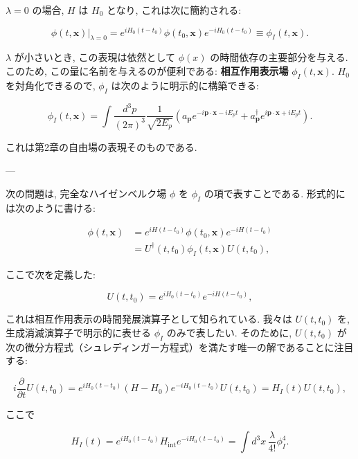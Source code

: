 \documentclass[a4paper,12pt]{article}
\begin{document}
$\lambda=0$ の場合, $H$ は $H_0$ となり, これは次に簡約される:

\begin{equation*}
\phi(t,\mathbf{x})\Big|_{\lambda=0} 
= e^{iH_0(t-t_0)} \phi(t_0,\mathbf{x}) e^{-iH_0(t-t_0)}
\equiv \phi_I(t,\mathbf{x}) .
\end{equation*}

$\lambda$ が小さいとき, この表現は依然として $\phi(x)$ の時間依存の主要部分を与える. 
このため, この量に名前を与えるのが便利である: 
\textbf{相互作用表示場} $\phi_I(t,\mathbf{x})$. 
$H_0$ を対角化できるので, $\phi_I$ は次のように明示的に構築できる:

\begin{equation*}
\phi_I(t,\mathbf{x}) = \int \frac{d^3p}{(2\pi)^3} \frac{1}{\sqrt{2E_p}}
\left( a_{\mathbf{p}} e^{-i\mathbf{p}\cdot \mathbf{x} - iE_p t} 
+ a^\dagger_{\mathbf{p}} e^{i\mathbf{p}\cdot \mathbf{x} + iE_p t} \right).
\end{equation*}

これは第2章の自由場の表現そのものである.

---

次の問題は, 完全なハイゼンベルク場 $\phi$ を $\phi_I$ の項で表すことである. 
形式的には次のように書ける:

\begin{align*}
\phi(t,\mathbf{x}) 
&= e^{iH(t-t_0)} \phi(t_0,\mathbf{x}) e^{-iH(t-t_0)} \\
&= U^\dagger(t,t_0)\phi_I(t,\mathbf{x})U(t,t_0),
\end{align*}

ここで次を定義した:

\begin{equation*}
U(t,t_0) = e^{iH_0(t-t_0)} e^{-iH(t-t_0)},
\end{equation*}

これは相互作用表示の時間発展演算子として知られている. 
我々は $U(t,t_0)$ を, 生成消滅演算子で明示的に表せる $\phi_I$ のみで表したい. 
そのために, $U(t,t_0)$ が次の微分方程式（シュレディンガー方程式）を満たす唯一の解であることに注目する:

\begin{equation*}
i \frac{\partial}{\partial t} U(t,t_0) 
= e^{iH_0(t-t_0)} (H-H_0)e^{-iH_0(t-t_0)} U(t,t_0)
= H_I(t) U(t,t_0),
\end{equation*}

ここで

\begin{equation*}
H_I(t) = e^{iH_0(t-t_0)} H_{\text{int}} e^{-iH_0(t-t_0)}
= \int d^3x \, \frac{\lambda}{4!} \phi_I^4 .
\end{equation*}
\end{document}
